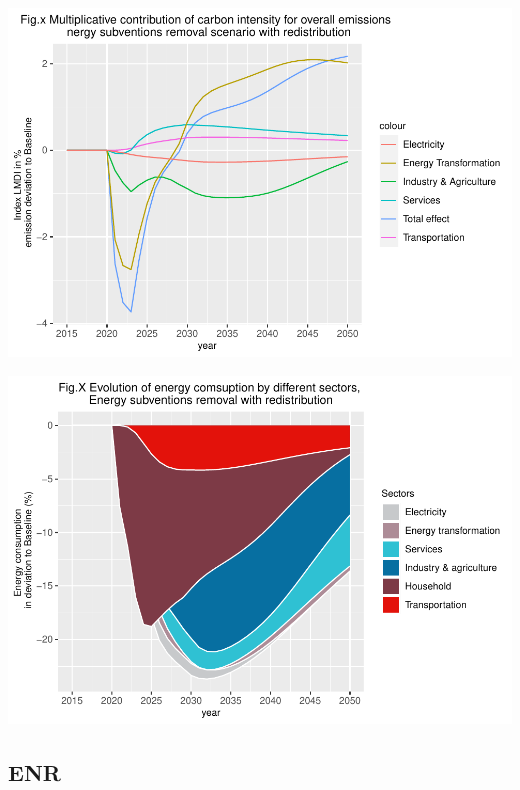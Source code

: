 \documentclass[
]{article}
\begin{document}
\includegraphics{Modele-ThreeMe-Tunisie_Sequeira_Valilou_Wang_files/figure-latex/unnamed-chunk-32-1.pdf}

\includegraphics{Modele-ThreeMe-Tunisie_Sequeira_Valilou_Wang_files/figure-latex/unnamed-chunk-33-1.pdf}

\hypertarget{enr-1}{%
\subsection{ENR}\label{enr-1}}
\end{document}
